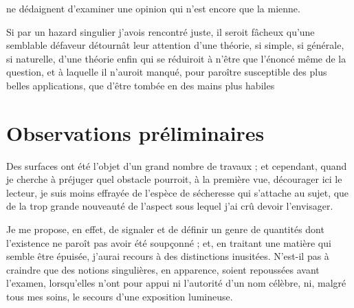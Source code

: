 \documentclass[11pt,a4paper]{article}
\begin{document}

ne dédaignent d'examiner une opinion qui n'est encore que la mienne.

Si par un hazard singulier j'avois rencontré juste, il seroit fâcheux qu'une
semblable défaveur détournât leur attention d'une théorie, si simple, si
générale, si naturelle, d'une théorie enfin qui se réduiroit à n'être que
l'énoncé même de la question, et à laquelle il n'auroit manqué, pour paroître
susceptible des plus belles applications, que d'être tombée en des mains plus
habiles


\section{Observations préliminaires}

Des surfaces ont été l'objet d'un grand nombre de travaux ; et cependant,
quand je cherche à préjuger quel obstacle pourroit, à la première vue,
décourager ici le lecteur, je suis moins effrayée de l'espèce de sécheresse
qui s'attache au sujet, que de la trop grande nouveauté de l'aspect sous
lequel j'ai crû devoir l'envisager.

Je me propose, en effet, de signaler et de définir un genre de quantités dont
l'existence ne paroît pas avoir été soupçonné ; et, en traitant une matière
qui semble être épuisée, j'aurai recours à des distinctions
inusitées. N'est-il pas à craindre que des notions singulières, en apparence,
soient repoussées avant l'examen, lorsqu'elles n'ont pour appui ni l'autorité
d'un nom célèbre, ni, malgré tous mes soins, le secours d'une exposition
lumineuse.
\end{document}
